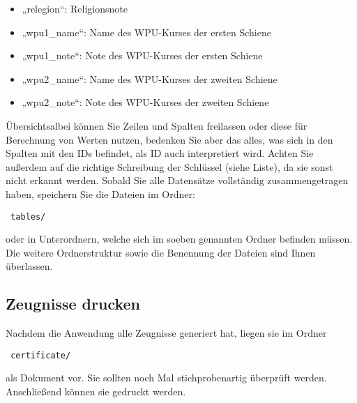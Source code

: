 \documentclass[a4paper,10pt]{scrartcl}
\begin{document}
      \begin{itemize}
         \item „relegion“: Religionsnote
         \item „wpu1\_name“: Name des WPU-Kurses der ersten Schiene
         \item „wpu1\_note“: Note des WPU-Kurses der ersten Schiene
	 \item „wpu2\_name“: Name des WPU-Kurses der zweiten Schiene
         \item „wpu2\_note“: Note des WPU-Kurses der zweiten Schiene
      \end{itemize}
      Übersichtsalbei können Sie Zeilen und Spalten freilassen oder diese für Berechnung von Werten nutzen, bedenken Sie aber das alles, was sich in den Spalten mit den IDs befindet, als ID auch interpretiert wird.\newline
      Achten Sie außerdem auf die richtige Schreibung der Schlüssel (siehe Liste), da sie sonst nicht erkannt werden. \newline
      Sobald Sie alle Datensätze vollständig zusammengetragen haben, speichern Sie die Dateien im Ordner:
      \begin{verbatim} tables/  \end{verbatim} 
      oder in Unterordnern, welche sich im soeben genannten Ordner befinden müssen. Die weitere Ordnerstruktur sowie die Benennung der Dateien sind Ihnen überlassen.
   \subsection{Zeugnisse drucken}
      Nachdem die Anwendung alle Zeugnisse generiert hat, liegen sie im Ordner
      \begin{verbatim} certificate/  \end{verbatim}
      als Dokument vor. Sie sollten noch Mal stichprobenartig überprüft werden. Anschließend können sie gedruckt werden.
\end{document}
